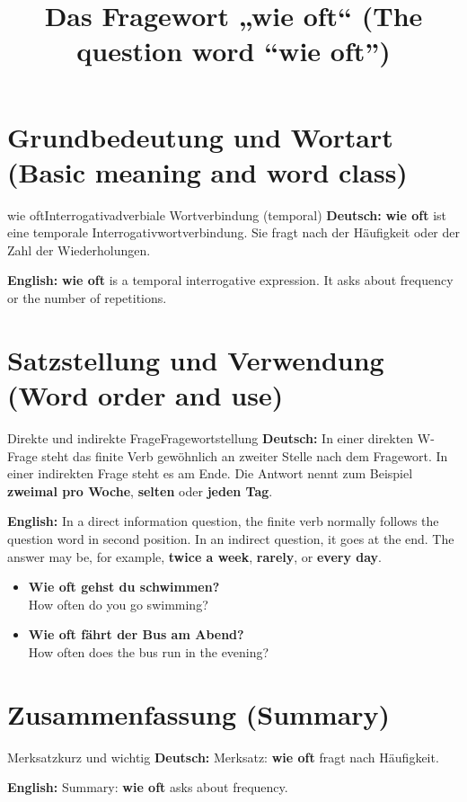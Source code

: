 \documentclass[a4paper,11pt]{article}
\title{Das Fragewort „wie oft“ (The question word “wie oft”)}
\date{}
\newcommand{\GermanText}[1]{\textbf{Deutsch: }#1\par}
\newcommand{\EnglishText}[1]{{\small\color{SoftGray}\textbf{English: }#1\par}}
\newcommand{\ExampleItem}[2]{\item \textbf{#1}\\{\small\color{SoftGray}#2}}
\begin{document}
\maketitle
\tableofcontents
\newpage
\section{Grundbedeutung und Wortart (Basic meaning and word class)}
\begin{grammarentry}{wie oft}{Interrogativadverbiale Wortverbindung (temporal)}
\GermanText{\textbf{wie oft} ist eine temporale Interrogativwortverbindung. Sie fragt nach der Häufigkeit oder der Zahl der Wiederholungen.}
\EnglishText{\textbf{wie oft} is a temporal interrogative expression. It asks about frequency or the number of repetitions.}

\end{grammarentry}
\section{Satzstellung und Verwendung (Word order and use)}
\begin{grammarentry}{Direkte und indirekte Frage}{Fragewortstellung}
\GermanText{In einer direkten W-Frage steht das finite Verb gewöhnlich an zweiter Stelle nach dem Fragewort. In einer indirekten Frage steht es am Ende. Die Antwort nennt zum Beispiel \textbf{zweimal pro Woche}, \textbf{selten} oder \textbf{jeden Tag}.}
\EnglishText{In a direct information question, the finite verb normally follows the question word in second position. In an indirect question, it goes at the end. The answer may be, for example, \textbf{twice a week}, \textbf{rarely}, or \textbf{every day}.}
\end{grammarentry}
\begin{exbox}\begin{itemize}
\ExampleItem{Wie oft gehst du schwimmen?}{How often do you go swimming?}
\ExampleItem{Wie oft fährt der Bus am Abend?}{How often does the bus run in the evening?}
\end{itemize}\end{exbox}
\section{Zusammenfassung (Summary)}
\begin{grammarentry}{Merksatz}{kurz und wichtig}
\GermanText{Merksatz: \textbf{wie oft} fragt nach Häufigkeit.}
\EnglishText{Summary: \textbf{wie oft} asks about frequency.}
\end{grammarentry}
\end{document}
